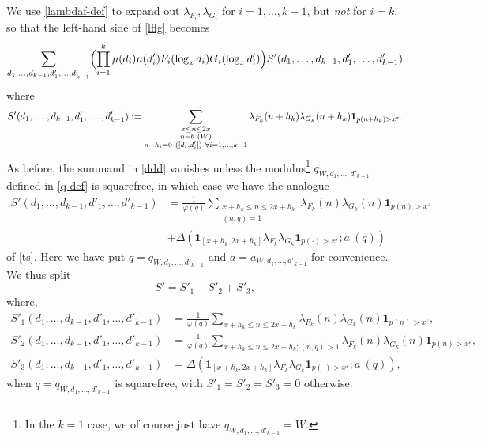 \documentclass{bmcart}
\theoremstyle{plain}
\theoremstyle{definition}
\newcommand\eps{\varepsilon}
\renewcommand{\phi}{\varphi}
\newcommand{\onef}{\mathbf{1}}
\begin{document}
We use \eqref{lambdaf-def} to expand out $\lambda_{F_{i}}, \lambda_{G_{i}}$ for $i=1,\dots,k-1$, but \emph{not} for $i=k$, so that the left-hand side of \eqref{lflg} becomes
\begin{equation}\label{ddd}
 \sum_{d_1,\dots,d_{k-1},d'_1,\dots,d'_{k-1}} \Bigl(\prod_{i=1}^k \mu(d_{i}) \mu(d'_{i}) F_{i}(\log_x d_{i}) G_{i}(\log_x d'_{i}) \Bigr) S'(d_1,\dots,d_{k-1},d'_1,\dots,d'_{k-1})
\end{equation}
where
$$ S'(d_1,\dots,d_{k-1},d'_1,\dots,d'_{k-1}) := 
 \sum_{\substack{x \leq n \leq 2x\\ n = b\ (W) \\ n + h_{i} = 0\ ([d_{i},d'_{i}])\ \forall i=1,\dots,k-1}}
\hspace{0pt minus 1fil}
 \lambda_{F_k}(n+h_k) \lambda_{G_k}(n+h_k) \onef_{p(n+h_k) 
> x^\eps}.
$$
As before, the summand in \eqref{ddd} vanishes unless the modulus\footnote{In the $k=1$ case, we of course just have $q_{W,d_1,\dots,d'_{k-1}} = W$.}
$q_{W,d_1,\dots,d'_{k-1}}$ defined in \eqref{q-def} is squarefree, in which case we have the analogue
\begin{align}\label{tsp}
 S'(d_1,\dots,d_{k-1},d'_1,\dots,d'_{k-1}) &= \frac{1}{\phi(q)} \sum_{\substack{x+h_k \leq n \leq 2x+h_k\\ (n,q)=1}} \lambda_{F_k}(n) \lambda_{G_k}(n) \onef_{p(n)>x^\eps}\nonumber\\
& + \Delta( \onef_{[x+h_k,2x+h_k]} \lambda_{F_k} \lambda_{G_k} \onef_{p(\cdot) > x^\eps};  a\ (q))
\end{align}
of \eqref{ts}. Here we have put $q=q_{W,d_1,\dots,d'_{k-1}}$ and $a=a_{W,d_1,\dots,d'_{k-1}}$ for convenience. We thus split
$$ S' = S'_1 - S'_2 + S'_3,$$
where,
\begin{align}
 S'_1(d_1,\dots,d_{k-1},d'_1,\dots,d'_{k-1}) &= \frac{1}{\phi(q)} \sum_{x+h_k \leq n \leq 2x+h_k} \lambda_{F_k}(n) \lambda_{G_k}(n) \onef_{p(n)>x^\eps} 
\label{sp1-def},\\
 S'_2(d_1,\dots,d_{k-1},d'_1,\dots,d'_{k-1}) &= \frac{1}{\phi(q)} \sum_{x+h_k \leq n \leq 2x+h_k; (n,q) > 1} \lambda_{F_k}(n) \lambda_{G_k}(n) \onef_{p(n)>x^\eps} 
\label{sp2-def},\\
 S'_3(d_1,\dots,d_{k-1},d'_1,\dots,d'_{k-1}) &= \Delta( \onef_{[x+h_k,2x+h_k]} \lambda_{F_k} \lambda_{G_k} \onef_{p(\cdot) > x^\eps};  a\ (q)),
\label{sp3-def}
\end{align}
when $q=q_{W,d_1,\dots,d'_{k-1}}$ is squarefree, with $S'_1=S'_2=S'_3=0$ otherwise.
\end{document}
